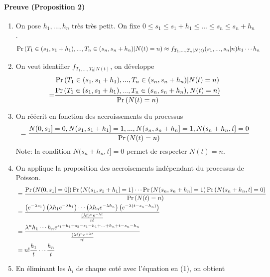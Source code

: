\paragraph{Preuve (Proposition 2)} 
\begin{enumerate}[label=(\arabic*)]
    \item On pose $h_1,...,h_n$ très très petit. On fixe $0\leq s_1 \leq s_1 + h_1 \leq ... \leq s_n \leq s_n + h_n$.
    \begin{align*}
        \Pr \left( T_1 \in (s_1,s_1 + h_1),..., T_n \in (s_n, s_n + h_n)|N(t) = n \right)
        &\approx f_{T_1,...,T_n|N(t)}(s_1,...,s_n|n) h_1 \cdots h_n 
    \end{align*}
    \item On veut identifier $f_{T_1,...,T_n|N(t)}$, on développe
    \begin{align*}
        & \Pr \left( T_1 \in (s_1,s_1 + h_1),..., T_n \in (s_n, s_n + h_n)|N(t) = n \right) \\
        =& \frac{\Pr \left( T_1 \in (s_1,s_1 + h_1),..., T_n \in (s_n, s_n + h_n),N(t) = n \right)}{\Pr \left( N(t) = n \right)} \\ 
    \end{align*}
    \item On réécrit en fonction des accroissements du processus
    \begin{align*}
         = \frac{N(0,s_1] = 0, N(s_1, s_1 + h_1]=1,...,N(s_n, s_n + h_n]=1, N(s_n + h_n, t] = 0}{\Pr \left( N(t) = n \right)}
    \end{align*}
        Note: la condition $N(s_n + h_n, t] = 0$ permet de respecter $N(t) = n$.
    \item On applique la proposition des accroisements indépendant du processus de Poisson.
    \begin{align*}
        &= \frac{\Pr \left( N(0,s_1] = 0] \right)\Pr \left( N(s_1, s_1 + h_1]=1 \right)\cdots \Pr \left( N(s_n, s_n + h_n]=1 \right)\Pr \left( N(s_n + h_n, t] = 0 \right)}{\Pr \left( N(t) = n \right)} \\
        &= \frac{\left( e^{-\lambda s_1} \right)\left(\lambda h_1  e^{-\lambda h_1} \right)\cdots \left(\lambda h_n  e^{-\lambda h_n} \right)\left( e^{-\lambda (t - s_n - h_n)} \right)}{\frac{(\lambda t)^n e^{-\lambda t}}{n!}} \\
        &= \frac{\lambda^n h_1 \cdots h_n e^{s_1 + h_1 + s_2 - s_1 - h_1 + ... + h_n + t - s_n - h_n}}{\frac{(\lambda t)^n e^{-\lambda t}}{n!}} \\
        &= n! \frac{h_1}{t} \cdots \frac{h_n}{t} 
    \end{align*}
    \item En éliminant les $h_i$ de chaque coté avec l'équation en (1), on obtient

\end{enumerate}
